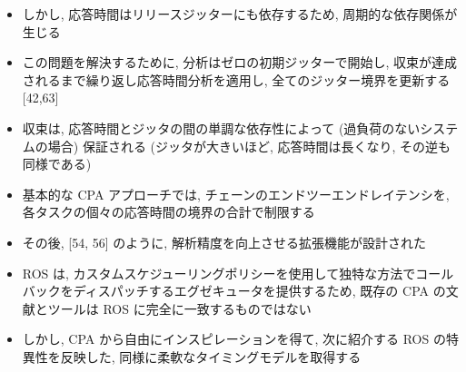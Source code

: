 \begin{frame}{}
    \begin{itemize}
        \item しかし, 応答時間はリリースジッターにも依存するため, 周期的な依存関係が生じる
        \item この問題を解決するために, 分析はゼロの初期ジッターで開始し, 収束が達成されるまで繰り返し応答時間分析を適用し, 全てのジッター境界を更新する [42,63]
        \item 収束は, 応答時間とジッタの間の単調な依存性によって (過負荷のないシステムの場合) 保証される (ジッタが大きいほど, 応答時間は長くなり, その逆も同様である)
        \item 基本的な CPA アプローチでは, チェーンのエンドツーエンドレイテンシを, 各タスクの個々の応答時間の境界の合計で制限する
        \item その後, [54, 56] のように, 解析精度を向上させる拡張機能が設計された
    \end{itemize}
\end{frame}

\begin{frame}{}
    \begin{itemize}
        \item ROS は, カスタムスケジューリングポリシーを使用して独特な方法でコールバックをディスパッチするエグゼキュータを提供するため, 既存の CPA の文献とツールは ROS に完全に一致するものではない
        \item しかし, CPA から自由にインスピレーションを得て, 次に紹介する ROS の特異性を反映した, 同様に柔軟なタイミングモデルを取得する
    \end{itemize}
\end{frame}

